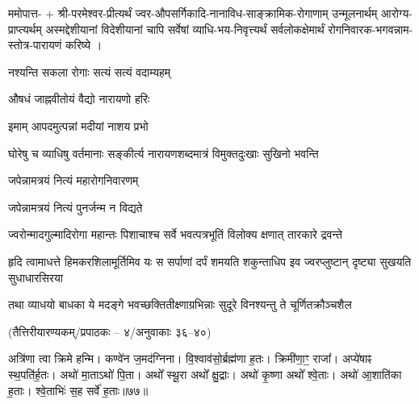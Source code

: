 

ममोपात्त- + श्री-परमेश्वर-प्रीत्यर्थं ज्वर-औपसर्गिकादि-नानाविध-साङ्क्रामिक-रोगाणाम् उन्मूलनार्थम् आरोग्य-प्राप्त्यर्थम् अस्मद्देशीयानां विदेशीयानां चापि सर्वेषां व्याधि-भय-निवृत्त्यर्थं सर्वलोकक्षेमार्थं रोगनिवारक-भगवन्नाम-स्तोत्र-पारायणं करिष्ये ।


{नश्यन्ति सकला रोगाः सत्यं सत्यं वदाम्यहम्}

{औषधं जाह्नवीतोयं वैद्यो नारायणो हरिः}

{इमाम् आपदमुत्पन्नां मदीयां नाशय प्रभो}

{घोरेषु च व्याधिषु वर्तमानाः}
{सङ्कीर्त्य नारायणशब्दमात्रं}
{विमुक्तदुःखाः सुखिनो भवन्ति}

{जपेन्नामत्रयं नित्यं महारोगनिवारणम्}

{जपेन्नामत्रयं नित्यं पुनर्जन्म न विद्यते}

{ज्वरोन्मादगुल्मादिरोगा महान्तः}
{पिशाचाश्च सर्वे भवत्पत्रभूतिं}
{विलोक्य क्षणात् तारकारे द्रवन्ते}

{हृदि त्वामाधत्ते हिमकरशिलामूर्तिमिव यः}
{स सर्पाणां दर्पं शमयति शकुन्ताधिप इव}
{ज्वरप्लुष्टान् दृष्ट्या सुखयति सुधाधारसिरया}%

{तथा व्याधयो बाधका ये मदङ्गे}
{भवच्छक्तितीक्ष्णाग्रभिन्नाः सुदूरे}
{विनश्यन्तु ते चूर्णितक्रौञ्चशैल}



\vspace{-1ex}
\centerline{\normalsize (तैत्तिरीयारण्यकम्/प्रपाठकः – ४/अनुवाकाः ३६--४०)}
\setmainfont[Script=Devanagari]{Siddhanta}
\setlength{\emergencystretch}{3em}

अत्रि॑णा त्वा क्रिमे हन्मि।
कण्वे॑न ज॒मद॑ग्निना।
वि॒श्वाव॑सो॒र्ब्रह्म॑णा ह॒तः।
क्रिमी॑णा॒ꣳ॒ राजा᳚।
अप्ये॑षाꣴ स्थ॒पति॑र्\mbox{}ह॒तः।
अथो॑ मा॒ताऽथो॑ पि॒ता।
अथो᳚ स्थू॒रा अथो᳚ क्षु॒द्राः।
अथो॑ कृ॒ष्णा अथो᳚ श्वे॒ताः।
अथो॑ आ॒शाति॑का ह॒ताः।
श्वे॒ताभिः॑ स॒ह सर्वे॑ ह॒ताः॥७७॥



